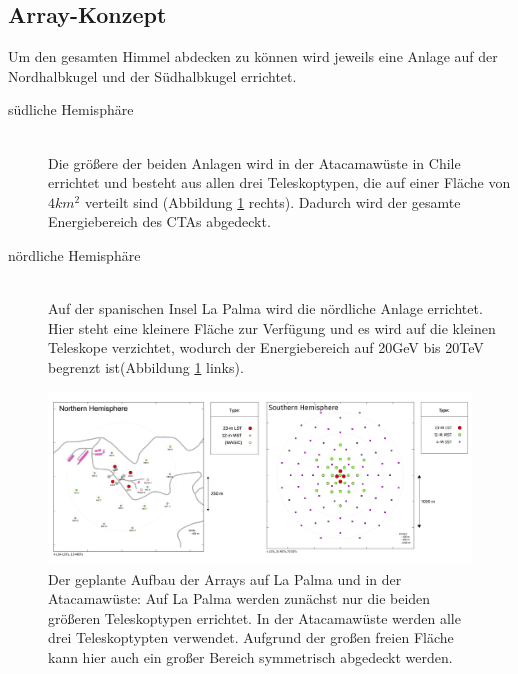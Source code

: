 \subsection{Array-Konzept}
Um den gesamten Himmel abdecken zu können wird jeweils eine Anlage auf der Nordhalbkugel und der Südhalbkugel errichtet.
\begin{description}
\item[südliche Hemisphäre]\hfill \\
Die größere der beiden Anlagen wird in der Atacamawüste in Chile errichtet und besteht aus allen drei Teleskoptypen, die auf einer Fläche von $4\unit{km^2}$ verteilt sind (Abbildung \ref{img:ArrayLayout} rechts). Dadurch wird der gesamte Energiebereich des CTAs abgedeckt.
\item[nördliche Hemisphäre]\hfill \\ 
Auf der spanischen Insel La Palma wird die nördliche Anlage errichtet. Hier steht eine kleinere Fläche zur Verfügung und es wird auf die kleinen Teleskope verzichtet, wodurch der Energiebereich auf 20GeV bis 20TeV begrenzt  ist(Abbildung \ref{img:ArrayLayout} links).
\end{description}

\begin{figure}[htbp]
\centering
\includegraphics[width=\textwidth]{Images/ArrayLayout.png}
\caption{Der geplante Aufbau der Arrays auf La Palma und in der Atacamawüste: Auf La Palma werden zunächst nur die beiden größeren Teleskoptypen errichtet. In der Atacamawüste werden alle drei Teleskoptypten verwendet. Aufgrund der großen freien Fläche kann hier auch ein großer Bereich symmetrisch abgedeckt werden.\cite{Flickr}}
\label{img:ArrayLayout}
\end{figure}

